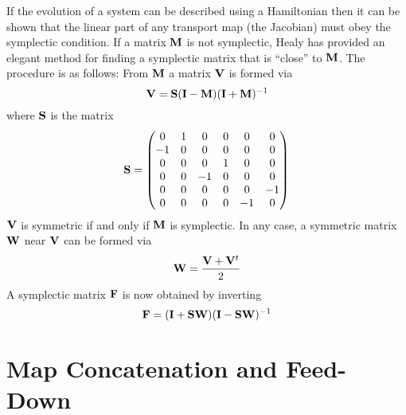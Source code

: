If the evolution of a system can be described using a Hamiltonian then
it can be shown that the linear part of any transport map (the Jacobian)
must obey the symplectic condition. If a matrix ${\bf M}$ is not symplectic,
Healy\cite{b:healy} has provided an elegant method for finding a symplectic 
matrix that is ``close'' to ${\bf M}$. The procedure is as follows:
From ${\bf M}$ a matrix ${\bf V}$ is formed via
\begin{equation}
  {\bf V} = {\bf S} ({\bf I} - {\bf M})({\bf I} + {\bf M})^{-1} 
  \label{e:vsimi}
\end{equation}
where ${\bf S}$ is the matrix
\begin{equation}
  {\bf S} = 
  \begin{pmatrix} 
      0 &  1 &  0 &  0 &  0 &  0 \cr
     -1 &  0 &  0 &  0 &  0 &  0 \cr
      0 &  0 &  0 &  1 &  0 &  0 \cr
      0 &  0 & -1 &  0 &  0 &  0 \cr
      0 &  0 &  0 &  0 &  0 & -1 \cr
      0 &  0 &  0 &  0 & -1 &  0 \cr
  \end{pmatrix}
  \label{s0100}
\end{equation}
${\bf V}$ is symmetric if and only if ${\bf M}$ is symplectic. In any case,
a symmetric matrix ${\bf W}$ near ${\bf V}$ can be
formed via
\begin{equation}
  {\bf W} = \frac{{\bf V} + {\bf V}^t}{2}
\end{equation}
A symplectic matrix ${\bf F}$ is now obtained by inverting 
\begin{equation}
  {\bf F} = ({\bf I} + {\bf S} {\bf W}) ({\bf I} - {\bf S} {\bf W})^{-1}
\end{equation}

\section{Map Concatenation and Feed-Down}
\label{s:map.concat}

